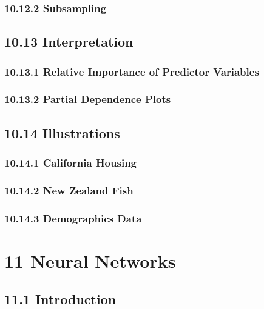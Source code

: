 \documentclass[11pt]{article}
\begin{document}
\subsubsection{10.12.2 Subsampling}\label{subsampling}

\subsection{10.13 Interpretation}\label{interpretation}

\subsubsection{10.13.1 Relative Importance of Predictor
Variables}\label{relative-importance-of-predictor-variables}

\subsubsection{10.13.2 Partial Dependence
Plots}\label{partial-dependence-plots}

\subsection{10.14 Illustrations}\label{illustrations}

\subsubsection{10.14.1 California Housing}\label{california-housing}

\subsubsection{10.14.2 New Zealand Fish}\label{new-zealand-fish}

\subsubsection{10.14.3 Demographics Data}\label{demographics-data}

    \section{11 Neural Networks}\label{neural-networks}

\subsection{11.1 Introduction}\label{introduction}
\end{document}
